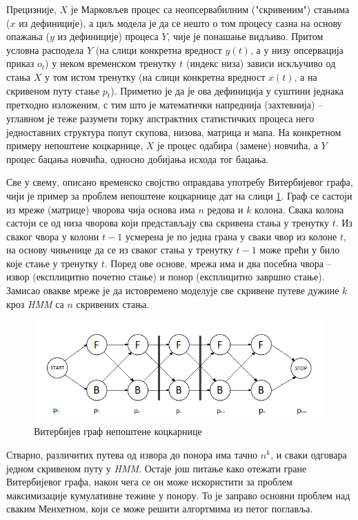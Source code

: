 \documentclass[12pt,oneside]{memoir}
\begin{document}
\begin{CJK}{UTF8}{ipxm}
Прецизније, $X$ је Марковљев процес са неопсервабилним ("скривеним") стањима ($x$ из дефиниције), а циљ модела је да се нешто о том процесу сазна на основу опажања ($y$ из дефиниције) процеса $Y$, чије је понашање видљиво. Притом условна расподела $Y$ (на слици конкретна вредност $y(t)$, а у низу опсервација приказ $o_t$) у неком временском тренутку $t$ (индекс низа) зависи искључиво од стања $X$ у том истом тренутку (на слици конкретна вредност $x(t)$, а на скривеном путу стање $p_t$). Приметно је да је ова дефиниција у суштини једнака претходно изложеним, с тим што је математички напреднија (захтевнија) -- углавном је теже разумети торку апстрактних статистичких процеса него једноставних структура попут скупова, низова, матрица и мапа. На конкретном примеру непоштене коцкарнице, $X$ је процес одабира (замене) новчића, а $Y$ процес бацања новчића, односно добијања исхода тог бацања.

Све у свему, описано временско својство оправдава употребу Витербијевог графа, чији је пример за проблем непоштене коцкарнице дат на слици \ref{fig:kockvit}. Граф се састоји из мреже (матрице) чворова чија основа има $n$ редова и $k$ колона. Свака колона састоји се од низа чворова који представљају сва скривена стања у тренутку $t$. Из сваког чвора у колони $t-1$ усмерена је по једна грана у сваки чвор из колоне $t$, на основу чињенице да се из сваког стања у тренутку $t-1$ може прећи у било које стање у тренутку $t$. Поред ове основе, мрежа има и два посебна чвора -- извор (експлицитно почетно стање) и понор (експлицитно завршно стање). Замисао овакве мреже је да истовремено моделује све скривене путеве дужине $k$ кроз \textit{HMM} са $n$ скривених стања.

\begin{figure}[!ht]
  \centering
  \includegraphics[width=\textwidth]{kock_graf.png}
  \caption{Витербијев граф непоштене коцкарнице}
  \label{fig:kockvit}
\end{figure}

Стварно, различитих путева од извора до понора има тачно $n^k$, и сваки одговара једном скривеном путу у \textit{HMM}. Остаје још питање како отежати гране Витербијевог графа, након чега се он може искористити за проблем максимизације кумулативне тежине у понору. То је заправо основни проблем над сваким Менхетном, који се може решити алгортмима из петог поглавља.


\end{CJK}
\end{document}
